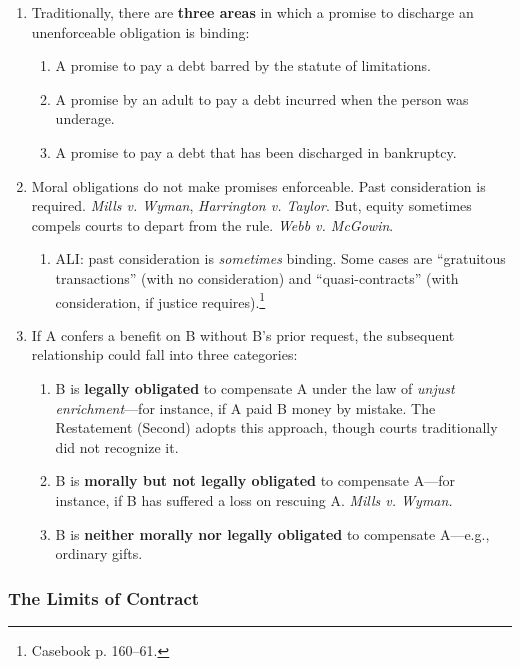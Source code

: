 \begin{enumerate}
    \item Traditionally, there are \textbf{three areas} in which a promise to 
    discharge an unenforceable obligation is binding:
    \begin{enumerate}
        \item A promise to pay a debt barred by the statute of limitations.
        \item A promise by an adult to pay a debt incurred when the person was 
        underage.
        \item A promise to pay a debt that has been discharged in bankruptcy.
    \end{enumerate}
    \item Moral obligations do not make promises enforceable. Past 
    consideration is required. \emph{Mills v. Wyman}, \emph{Harrington v. 
    Taylor}. But, equity sometimes compels courts to depart from the rule. 
    \emph{Webb v. McGowin}.
    \begin{enumerate}
        \item ALI: past consideration is \emph{sometimes} binding. Some cases 
        are ``gratuitous transactions'' (with no consideration) and 
        ``quasi-contracts'' (with consideration, if justice 
        requires).\footnote{Casebook p. 160--61.}
    \end{enumerate}
    \item If A confers a benefit on B without B's prior request, the 
    subsequent relationship could fall into three categories:
    \begin{enumerate}
        \item B is \textbf{legally obligated} to compensate A under the law of 
        \emph{unjust enrichment}---for instance, if A paid B money by mistake. 
        The Restatement (Second) adopts this approach, though courts 
        traditionally did not recognize it.
        \item B is \textbf{morally but not legally obligated} to compensate 
        A---for instance, if B has suffered a loss on rescuing A. \emph{Mills 
        v. Wyman.}
        \item B is \textbf{neither morally nor legally obligated} to 
        compensate A---e.g., ordinary gifts.
    \end{enumerate}
\end{enumerate}

\subsubsection{The Limits of Contract}

